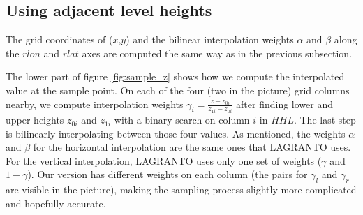

\subsection{Using adjacent level heights}\label{sec:zsampling_mine}
The grid coordinates of ($x$,$y$) and the bilinear interpolation weights $\alpha$ and $\beta$ along the $rlon$ and $rlat$ axes are computed the same way as in the previous subsection.

The lower part of figure \ref{fig:sample_z} shows how we compute the interpolated value at the sample point. On each of the four (two in the picture) grid columns nearby, we compute interpolation weights $\gamma_i = \frac{z-z_{0i}}{z_{1i}-z_{0i}}$ after finding lower and upper heights $z_{0i}$ and $z_{1i}$ with a binary search on column $i$ in $HHL$. The last step is bilinearly interpolating between those four values. As mentioned, the weights $\alpha$ and $\beta$ for the horizontal interpolation are the same ones that LAGRANTO uses. For the vertical interpolation, LAGRANTO uses only one set of weights ($\gamma$ and $1-\gamma$). Our version has different weights on each column (the pairs for $\gamma_l$ and $\gamma_r$ are visible in the picture), making the sampling process slightly more complicated and hopefully accurate.

